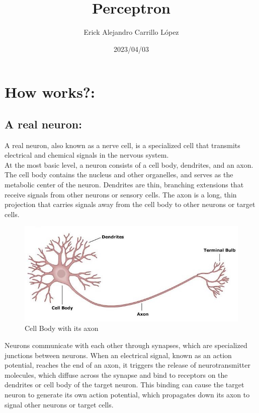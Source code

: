 \documentclass[12pt]{article}
\title{Perceptron}
\author{Erick Alejandro Carrillo López}
\date{2023/04/03}
\begin{document}
\maketitle
\tableofcontents
\newpage

\section{How works?:}
\subsection{A real neuron:}
A real neuron, also known as a nerve cell, is a specialized cell that transmits
electrical and chemical signals in the nervous system.\\
At the most basic level, a neuron consists of a cell body, dendrites, and an axon.
The cell body contains the nucleus and other organelles, and serves as the metabolic center
of the neuron. Dendrites are thin, branching extensions that receive signals from other
neurons or sensory cells. The axon is a long, thin projection that carries signals away
from the cell body to other neurons or target cells.
\begin{figure}[h]
  \centering
  \includegraphics[scale = 0.5]{cell-body.jpg}
  \caption{Cell Body with its axon}
\end{figure}
Neurons communicate with each other through synapses, which are specialized
junctions between neurons. When an electrical signal, known as an action potential,
reaches the end of an axon, it triggers the release of neurotransmitter molecules, which diffuse
across the synapse and bind to receptors on the dendrites or cell body of the target neuron. This
binding can cause the target neuron to generate its own action potential, which propagates down its
axon to signal other neurons or target cells.
\end{document}
